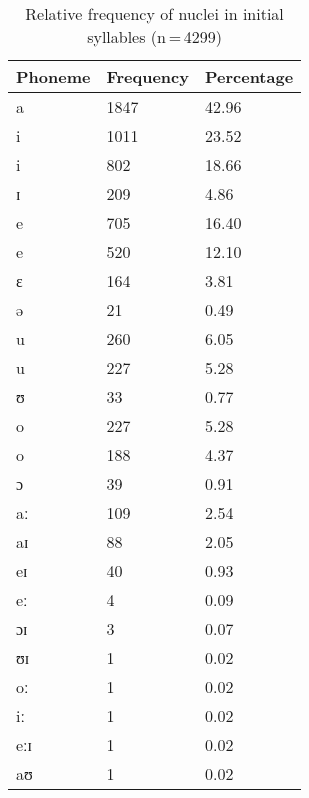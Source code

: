 \begin{table}[hp]\centering
\caption[Relative frequency of nuclei in initial syllables]{Relative frequency of nuclei in initial syllables (n\,=\,4299)}
\begin{tabu} to 0.5\textwidth{X X[c] X[c]}
\tableheaderfont\toprule
Phoneme
	& Frequency
	& Percentage
	\\
	
\toprule

a	&	1847	&	42.96\pct\\

\midrule

i	&	1011	&	23.52\pct\\
\rowfont{\scriptsize\itshape}
\raggedleft
i	&	802	&	18.66\pct\\
\rowfont{\scriptsize\itshape}
\raggedleft
ɪ	&	209	&	4.86\pct\\

\midrule

e	&	705	&	16.40\pct\\
\rowfont{\scriptsize\itshape}
\raggedleft
e	&	520	&	12.10\pct\\
\rowfont{\scriptsize\itshape}
\raggedleft
ɛ	&	164	&	3.81\pct\\
\rowfont{\scriptsize\itshape}
\raggedleft
ə	&	21	&	0.49\pct\\

\midrule

u	&	260	&	6.05\pct\\
\rowfont{\scriptsize\itshape}
\raggedleft
u	&	227	&	5.28\pct\\
\rowfont{\scriptsize\itshape}
\raggedleft
ʊ	&	33	&	0.77\pct\\

\midrule

o	&	227	&	5.28\pct\\
\rowfont{\scriptsize\itshape}
\raggedleft
o	&	188	&	4.37\pct\\
\rowfont{\scriptsize\itshape}
\raggedleft
ɔ	&	39	&	0.91\pct\\

\midrule

aː	&	109	&	2.54\pct\\
aɪ	&	88	&	2.05\pct\\
eɪ	&	40	&	0.93\pct\\
eː	&	4	&	0.09\pct\\
ɔɪ	&	3	&	0.07\pct\\
ʊɪ	&	1	&	0.02\pct\\
oː	&	1	&	0.02\pct\\
iː	&	1	&	0.02\pct\\
eːɪ	&	1	&	0.02\pct\\
aʊ	&	1	&	0.02\pct\\

\bottomrule
\end{tabu}
\label{tab:initnuc}
\end{table}

